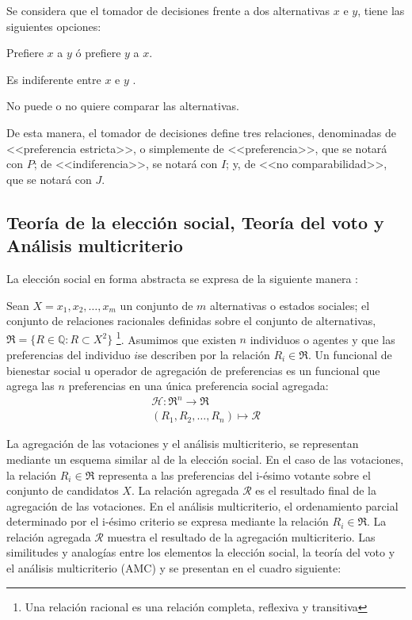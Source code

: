 \documentclass[a5paper,doc,10pt,noapacite]{apa6}
\begin{document}
{{	Se considera que el tomador de decisiones frente a dos alternativas \(x\) e \(y\), tiene las siguientes opciones:
\begin{APAitemize}
    \item Prefiere  \(x\) a \(y\) ó prefiere \(y\) a \(x\).
    \item Es indiferente entre \(x\) e \(y\) .
    \item No puede o no quiere comparar las alternativas.
\end{APAitemize}

	De esta manera, el tomador de decisiones define tres relaciones, denominadas de <<preferencia estricta>>, o simplemente de <<preferencia>>, que se notará con \(P\); de <<indiferencia>>, se notará con \(I\); y, de <<no comparabilidad>>, que se notará con \(J\).
	
	\subsection{Teoría de la elección social, Teoría del voto y Análisis multicriterio}
	
	La elección social en forma abstracta se expresa de la siguiente manera \cite{Colell-1995}: 

Sean \(X = x_1, x_2,\dots, x_m\) un conjunto de \(m\) alternativas o estados sociales; el conjunto de relaciones racionales definidas sobre el conjunto de alternativas, \(\Re = \{ R\in \mathbb{Q}: R \subset X^2\}\) \footnote{Una relación racional es una relación completa, reflexiva y transitiva}.  Asumimos que existen \(n\) individuos o agentes y que las preferencias del individuo \(i\)se describen por la relación \(R_i \in \Re\). Un funcional de bienestar social u operador de agregación de preferencias es un funcional que agrega las \(n\) preferencias en una única preferencia social agregada:
	\begin{align*}
	 \mathcal{H} : \Re ^n \longrightarrow \Re \\
    (R_1, R_2, \dots, R_n) \mapsto \mathcal{R}
	\end{align*}

	La agregación de las votaciones y el análisis multicriterio, se representan mediante un esquema similar al de la elección social. En el caso de las votaciones, la relación \(R_i \in \Re\) representa a las preferencias del i-ésimo votante sobre el conjunto de candidatos \(X\). La
relación agregada \(\mathcal{R}\) es el resultado final de la agregación de las votaciones. En el análisis multicriterio, el ordenamiento parcial determinado por el i-ésimo criterio se expresa mediante la relación \(R_i \in \Re\). La relación agregada \(\mathcal{R}\) muestra el resultado de la agregación multicriterio.
Las similitudes y analogías entre los elementos la elección social, la teoría del voto y el análisis multicriterio (AMC) y se presentan en el cuadro siguiente:


}}
\end{document}
